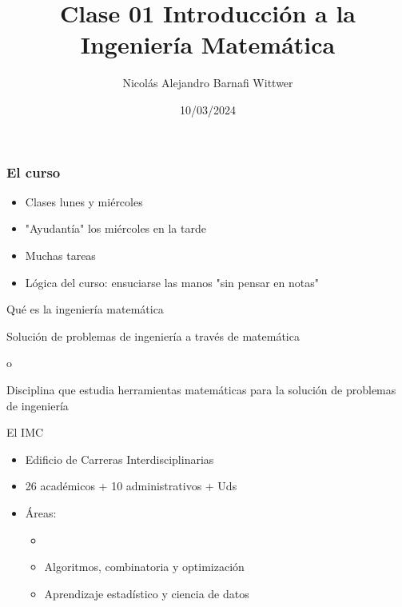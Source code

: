 \documentclass[14pt,aspectratio=169,xcolor=dvipsnames]{beamer}
\title[short title]{Clase 01 Introducción a la Ingeniería Matemática}
\subtitle{}
\author[NA Barnafi] {Nicolás Alejandro Barnafi Wittwer}
\institute[UC|CMM] 
{
    Pontificia Universidad Católica de Chile \\
    Centro de Modelamiento Matemático
}
\date{10/03/2024}
\begin{document}
\begin{frame}
    \maketitle
\end{frame}
\begin{frame}\frametitle{El curso}
    \begin{itemize}
        \item Clases lunes y miércoles
        \item "Ayudantía" los miércoles en la tarde
        \item Muchas tareas
        \item Lógica del curso: ensuciarse las manos "sin pensar en notas"
    \end{itemize}
\end{frame}
\begin{frame}{Qué es la ingeniería matemática}
    \pause
    \begin{block}{}
        Solución de problemas de ingeniería a través de matemática
    \end{block}
    \pause o
    \begin{block}{}
        Disciplina que estudia herramientas matemáticas para la solución de problemas de ingeniería
    \end{block}
\end{frame}
\begin{frame}{El IMC}
    \begin{itemize}
        \item Edificio de Carreras Interdisciplinarias
        \item 26 académicos + 10 administrativos + Uds
        \item Áreas:
            \begin{itemize}
                \item {}
                \item Algoritmos, combinatoria y optimización
                \item Aprendizaje estadístico y ciencia de datos
            \end{itemize}
    \end{itemize}
\end{frame}
\end{document}
